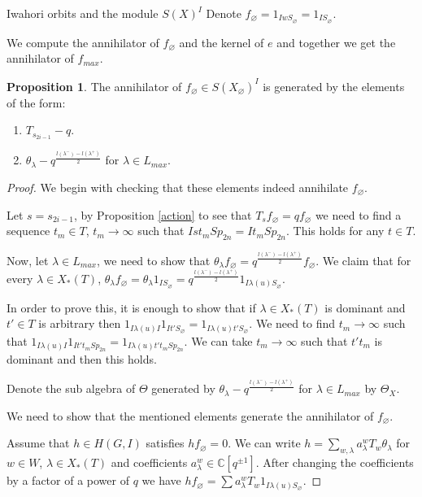 \documentclass[12pt]{article}
\newcommand{\C}{\mathbb{C}}
\newcommand{\<}{\langle}
\renewcommand{\>}{\rangle}
\renewcommand{\emptyset}{\varnothing}
\theoremstyle{plain}
\theoremstyle{definition}
\newtheorem{prop}[theorem]{Proposition}
\begin{document}
\begin{section}{Iwahori orbits and the module $S(X)^I$}
    Denote $f_\emptyset=1_{IwS_\emptyset}=1_{IS_\emptyset}$.

    We compute the annihilator of $f_\emptyset$ and the kernel of $e$ and together we get the annihilator of $f_{max}$.

    \begin{prop}
    The annihilator of $f_\emptyset\in S(X_\emptyset)^I$ is generated by the elements of the form:
    \begin{enumerate}
        \item $T_{s_{2i-1}}-q$.
        \item $\theta_{\lambda}-q^\frac{l(\lambda^-)-l(\lambda^+)}{2}$ for $\lambda\in L_{max}$.
    \end{enumerate}
    \end{prop}

    \begin{proof}
        We begin with checking that these elements indeed annihilate $f_\emptyset$.

        Let $s=s_{2i-1}$, by Proposition \ref{action} to see that $T_sf_\emptyset=qf_\emptyset$ we need to find a sequence $t_m\in T$, $t_m\rightarrow\infty$ such that $Ist_mSp_{2n}=It_mSp_{2n}$. This holds for any $t\in T$.

        Now, let $\lambda\in L_{max}$, we need to show that $\theta_{\lambda}f_\emptyset= q^\frac{l(\lambda^-)-l(\lambda^+)}{2}f_\emptyset$. We claim that for every $\lambda\in X_*(T)$, $\theta_{\lambda}f_\emptyset=\theta_{\lambda}1_{IS_\emptyset}= q^\frac{l(\lambda^-)-l(\lambda^+)}{2}1_{I\lambda(u)S_\emptyset}$. 
        
        In order to prove this, it is enough to show that if $\lambda\in X_*(T)$ is dominant and $t'\in T$ is arbitrary then $1_{I\lambda(u)I}1_{It'S_\emptyset}=1_{I\lambda(u)t'S_\emptyset}$. We need to find $t_m\rightarrow\infty$ such that $1_{I\lambda(u)I}1_{It't_mSp_{2n}}=1_{I\lambda(u)t't_mSp_{2n}}$. We can take $t_m\rightarrow\infty$ such that $t't_m$ is dominant and then this holds.

        Denote the sub algebra of $\Theta$ generated by $\theta_{\lambda}-q^\frac{l(\lambda^-)-l(\lambda^+)}{2}$ for $\lambda\in L_{max}$ by $\Theta_X$.

        We need to show that the mentioned elements generate the annihilator of $f_\emptyset$.

        Assume that $h\in H(G,I)$ satisfies $hf_\emptyset=0$. We can write $h=\sum_{w,\lambda} a_\lambda^wT_w\theta_\lambda$ for $w\in W$, $\lambda\in X_*(T)$ and coefficients $a_\lambda^w\in \C[q^{\pm 1}]$. After changing the coefficients by a factor of a power of $q$ we have $hf_\emptyset= \sum a_\lambda^w T_w1_{I\lambda(u)S_\emptyset}$.


\end{proof}
\end{section}
\end{document}
